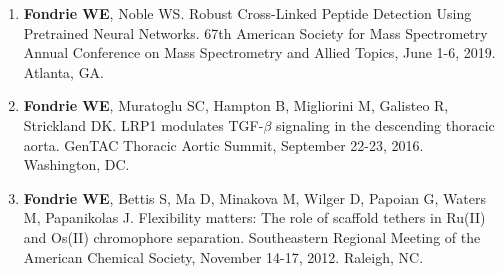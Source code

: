 \documentclass{article}
\newcommand{\mysection}[1]{\vspace{1ex}{\bf #1}}
\begin{document}
\mysection{Poster Presentations}

\begin{enumerate}

  \item {\bf Fondrie WE}, Noble WS. Robust Cross-Linked Peptide Detection Using
    Pretrained Neural Networks. 67th American Society for Mass Spectrometry
    Annual Conference on Mass Spectrometry and Allied Topics, June 1-6, 2019.
    Atlanta, GA.



  \item {\bf Fondrie WE}, Muratoglu SC, Hampton B, Migliorini M, Galisteo R,
    Strickland DK. LRP1 modulates TGF-$\beta$ signaling in the descending
    thoracic aorta. GenTAC Thoracic Aortic Summit, September 22-23, 2016.
    Washington, DC.



    
  \item {\bf Fondrie WE}, Bettis S, Ma D, Minakova M, Wilger D, Papoian G,
    Waters M, Papanikolas J. Flexibility matters: The role of scaffold tethers
    in Ru(II) and Os(II) chromophore separation. Southeastern Regional Meeting
    of the American Chemical Society, November 14-17, 2012. Raleigh, NC.
\end{enumerate}
\end{document}
